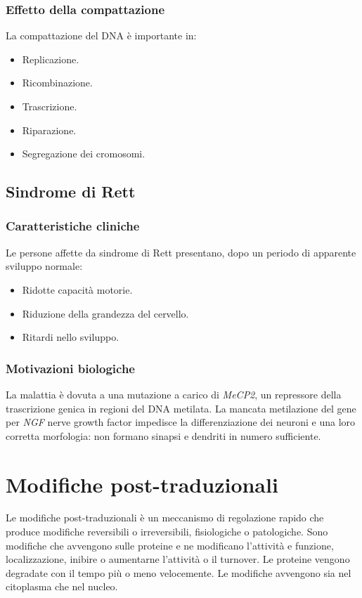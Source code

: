		\subsubsection{Effetto della compattazione}
		La compattazione del DNA \`e importante in:
		\begin{multicols}{3}
			\begin{itemize}
				\item Replicazione.
				\item Ricombinazione.
				\item Trascrizione.
				\item Riparazione.
				\item Segregazione dei cromosomi.
			\end{itemize}
		\end{multicols}

	\subsection{Sindrome di Rett}
	
		\subsubsection{Caratteristiche cliniche}
		Le persone affette da sindrome di Rett presentano, dopo un periodo di apparente sviluppo normale:
		\begin{multicols}{3}
			\begin{itemize}
				\item Ridotte capacit\`a motorie.
				\item Riduzione della grandezza del cervello.
				\item Ritardi nello sviluppo.
			\end{itemize}
		\end{multicols}

		\subsubsection{Motivazioni biologiche}
		La malattia \`e dovuta a una mutazione a carico di \emph{MeCP2}, un repressore della trascrizione genica in regioni del DNA metilata.
		La mancata metilazione del gene per \emph{NGF} nerve growth factor impedisce la differenziazione dei neuroni e una loro corretta morfologia: non formano sinapsi e dendriti in numero sufficiente.

\section{Modifiche post-traduzionali}
Le modifiche post-traduzionali \`e un meccanismo di regolazione rapido che produce modifiche reversibili o irreversibili, fisiologiche o patologiche.
Sono modifiche che avvengono sulle proteine e ne modificano l'attivit\`a e funzione, localizzazione, inibire o aumentarne l'attivit\`a o il turnover. 
Le proteine vengono degradate con il tempo pi\`u o meno velocemente.
Le modifiche avvengono sia nel citoplasma che nel nucleo.

